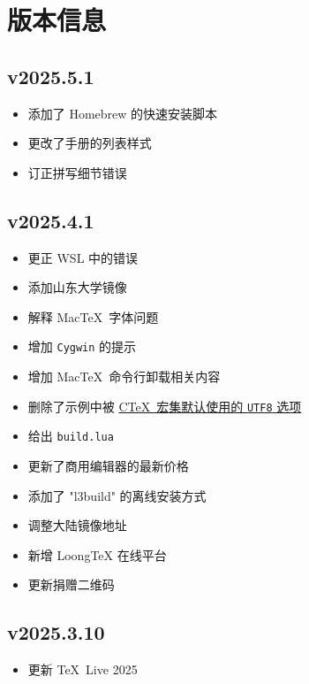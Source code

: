 
\twocolumn

\chapter{版本信息}

\section*{v2025.5.1}

\begin{itemize}
  \item 添加了 Homebrew 的快速安装脚本
  \item 更改了手册的列表样式
  \item 订正拼写细节错误
\end{itemize}

\section*{v2025.4.1}

\begin{itemize}
  \item 更正 WSL 中的错误
  \item 添加山东大学镜像
  \item 解释 Mac\TeX\ 字体问题
  \item 增加 \texttt{Cygwin} 的提示
  \item 增加 Mac\TeX\ 命令行卸载相关内容
  \item 删除了示例中被
  \href{http://mirrors.ctan.org/language/chinese/ctex/ctex.pdf#page6}{C\TeX\ 宏集默认使用的 \texttt{UTF8} 选项}
  \item 给出 \texttt{build.lua}
  \item 更新了商用编辑器的最新价格
  \item 添加了 "l3build" 的离线安装方式
  \item 调整大陆镜像地址
  \item 新增 LoongTeX 在线平台
  \item 更新捐赠二维码
\end{itemize}

\section*{v2025.3.10}

\begin{itemize}
  \item 更新 \TeX\ Live 2025
\end{itemize}

